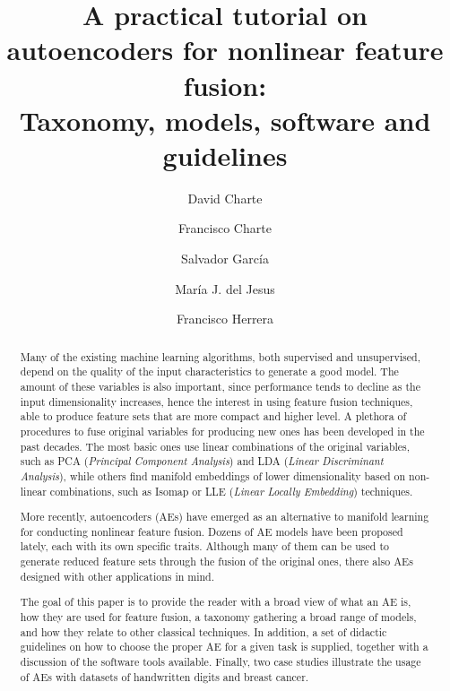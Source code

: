 \documentclass[preprint,5p,compress]{elsarticle}
\begin{document}
\begin{frontmatter}

\title{A practical tutorial on autoencoders for nonlinear feature fusion: \\Taxonomy, models, software and guidelines}

\author[UGR]{David Charte}

\author[UJA]{Francisco Charte}

\author[UGR]{Salvador Garc\'ia}

\author[UJA]{Mar\'ia J. del Jesus}

\author[UGR,IND]{Francisco Herrera}

\address[UGR]{Department of Computer Science and A.I., University of Granada, 18071 Granada, Spain}
\address[UJA]{Department of Computer Science, University of Ja\'en, 23071 Ja\'en, Spain}
\address[IND]{Faculty of Computing and Information Technology, King Abdulaziz University, 21589, Jeddah, Saudi Arabia}

\begin{abstract}
Many of the existing machine learning algorithms, both supervised and unsupervised, depend on the quality of the input characteristics to generate a good model. The amount of these variables is also important, since performance tends to decline as the input dimensionality increases, hence the interest in using feature fusion techniques, able to produce feature sets that are more compact and higher level. A plethora of procedures to fuse original variables for producing new ones has been developed in the past decades. The most basic ones use linear combinations of the original variables, such as PCA (\textit{Principal Component Analysis}) and LDA (\textit{Linear Discriminant Analysis}), while others find manifold embeddings of lower dimensionality based on non-linear combinations, such as Isomap or LLE (\textit{Linear Locally Embedding}) techniques. 

More recently, autoencoders (AEs) have emerged as an alternative to manifold learning for conducting nonlinear feature fusion. Dozens of AE models have been proposed lately, each with its own specific traits. Although many of them can be used to generate reduced feature sets through the fusion of the original ones, there also AEs designed with other applications in mind.

The goal of this paper is to provide the reader with a broad view of what an AE is, how they are used for feature fusion, a taxonomy gathering a broad range of models, and how they relate to other classical techniques. In addition, a set of didactic guidelines on how to choose the proper AE for a given task is supplied, together with a discussion of the software tools available. Finally, two case studies illustrate the usage of AEs with datasets of handwritten digits and breast cancer.
\end{abstract}


\end{frontmatter}
\end{document}
